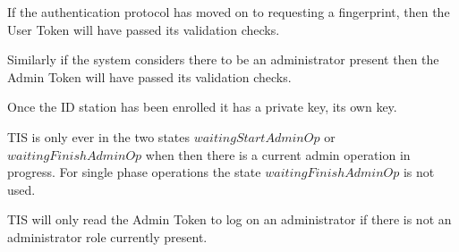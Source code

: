 If the authentication protocol has moved on to requesting a fingerprint,
then the User Token will have passed its validation checks.

Similarly if the system considers there to be an administrator present
then the Admin Token will have passed its validation checks.

Once the ID station has been enrolled it has a private key, its own key.

TIS is only ever in the two states $waitingStartAdminOp$ or
$waitingFinishAdminOp$ when then there is a current admin operation in
progress. For single phase operations the state
$waitingFinishAdminOp$ is not used.

TIS will only read the Admin Token to log on an administrator if there
is not an administrator role currently present.
 
